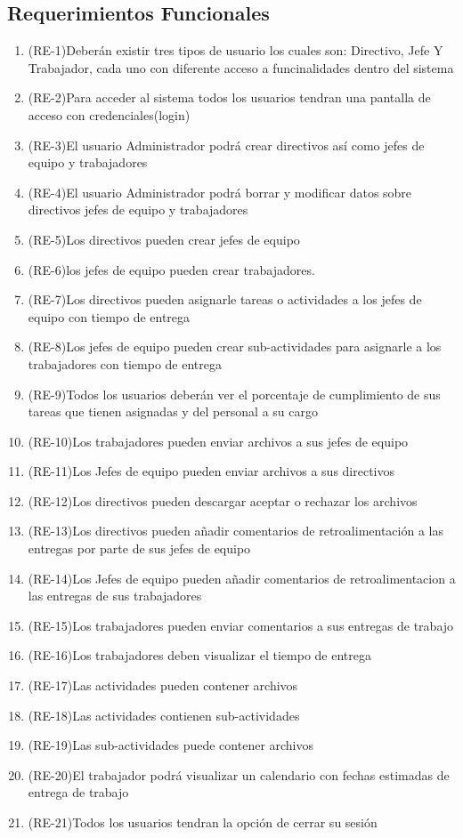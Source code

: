 \documentclass[11pt,a4paper]{article}
\begin{document}
\subsection{Requerimientos Funcionales}
\begin{enumerate}
\item (RE-1)Deberán existir tres tipos de usuario los cuales son: Directivo, Jefe Y Trabajador, cada uno con diferente acceso a funcinalidades dentro del sistema
\item (RE-2)Para acceder al sistema todos los usuarios tendran una pantalla de acceso con credenciales(login)
\item (RE-3)El usuario Administrador podrá crear directivos así como jefes de equipo y trabajadores
\item (RE-4)El usuario Administrador podrá borrar y modificar datos sobre directivos jefes de equipo y trabajadores
\item (RE-5)Los directivos pueden crear jefes de equipo 
\item (RE-6)los jefes de equipo pueden crear trabajadores. 
\item (RE-7)Los directivos pueden asignarle tareas o actividades a los jefes de equipo con tiempo de entrega
\item (RE-8)Los jefes de equipo pueden crear sub-actividades para asignarle a los trabajadores con tiempo de entrega
\item (RE-9)Todos los usuarios deberán ver el porcentaje de cumplimiento de sus tareas que tienen asignadas y del personal a su cargo
\item (RE-10)Los trabajadores pueden enviar archivos a sus jefes de equipo
\item (RE-11)Los Jefes de equipo pueden enviar archivos a sus directivos
\item (RE-12)Los directivos pueden descargar aceptar o rechazar los archivos
\item (RE-13)Los directivos pueden añadir comentarios de retroalimentación a las entregas por parte de sus jefes de equipo
\item (RE-14)Los Jefes de equipo pueden añadir comentarios de retroalimentacion a las entregas de sus trabajadores
\item (RE-15)Los trabajadores pueden enviar comentarios a sus entregas de trabajo
\item (RE-16)Los trabajadores deben visualizar el tiempo de entrega 
\item (RE-17)Las actividades pueden contener archivos
\item (RE-18)Las actividades contienen sub-actividades
\item (RE-19)Las sub-actividades puede contener archivos
\item (RE-20)El trabajador podrá visualizar un calendario con fechas estimadas de entrega de trabajo
\item (RE-21)Todos los usuarios tendran la opción de cerrar su sesión


\end{enumerate}
\end{document}
